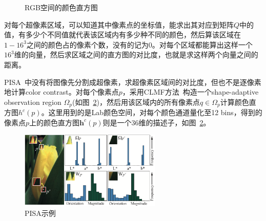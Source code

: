 \documentclass[12pt]{article}
\begin{document}
\begin{figure}
  \centering 
  \caption{RGB空间的颜色直方图}
  \label{fig: RGBhistogram} %
\end{figure}

对每个超像素区域，可以知道其中像素点的坐标值，能求出其对应到矩阵$Q$中的值，有多少个不同值就代表该区域内有多少种不同的颜色，然后算该区域在$1-16^3$之间的颜色占的像素个数，没有的记为0。对每个区域都能算出这样一个$16^3$维的向量，然后求区域之间的直方图的对比度，也就是求这样两个向量之间的距离。

PISA~\cite{shi2013pisa}中没有将图像先分割成超像素，求超像素区域间的对比度，但也不是逐像素地计算color contrast。对每个像素点$p$，采用CLMF方法~\cite{lu2012cross}构造一个shape-adaptive observation region $\Omega_p$(如图~\ref{fig: PISA示例})，然后用该区域内的所有像素点$q \in \Omega_p$计算颜色直方图$h^c(p)$。这里用到的是Lab颜色空间，对每个颜色通道量化至12 bins，得到的像素点$p$上的颜色直方图$\mathbf{h}^c(p)$则是一个36维的描述子，如图~\ref{fig: PISA示例}。

\begin{figure}[!ht]
\centering
\includegraphics[width=0.6\textwidth]{PISA示例}
\caption{PISA示例}
\label{fig: PISA示例}
\end{figure} 
\end{document}
